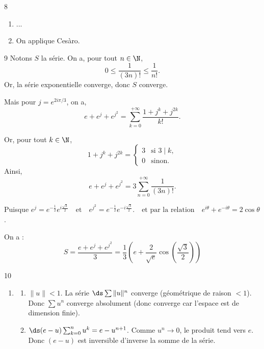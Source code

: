 \begin{correction}{8}
\begin{enumerate}
    \item ...
    \item On applique Cesàro.
\end{enumerate}
\end{correction}

\begin{correction}{9}
    Notons $S$ la série. On a, pour tout $n\in\N$,
    \[
    0\leq \frac{1}{(3n)!}\leq \frac{1}{n!}.
    \]
    Or, la série exponentielle converge, donc $S$ converge.
    
    Mais pour $j=e^{2i\pi/3}$, on a,
    \[
    e+e^j+e^{j^2}
    =\sum_{k=0}^{+\infty}\frac{1+j^k+j^{2k}}{k!}.
    \]
    
    Or, pour tout $k\in\N$,
    \[
    1+j^k+j^{2k}=
    \begin{cases}
        3 & \text{si } 3\mid k,\\
        0 & \text{sinon}.
    \end{cases}
    \]
    Ainsi,
    \[
    e+e^j+e^{j^2}
    =3\sum_{n=0}^{+\infty}\frac{1}{(3n)!}.
    \]
    
    Puisque $ e^j=e^{-\frac12}e^{i\frac{\sqrt{3}}{2}}
    \quad\text{et}\quad
    e^{j^2}=e^{-\frac12}e^{-i\frac{\sqrt{3}}{2}}.
    \quad\text{et par la relation}\quad
    e^{i\theta}+e^{-i\theta} = 2 \cos \theta
    $.
     
    On a :
    \[
    S = \frac{e+e^j+e^{j^2}}{3}
    = \frac13\left(e+\frac{2}{\sqrt{e}}\cos\left(\frac{\sqrt{3}}{2}\right)\right)
    \]
\end{correction}

\begin{correction}{10}
\begin{enumerate}
    \item
    \begin{enumerate}
        \item $\|u\| < 1$. La série $\ds \sum \|u\|^n$ converge (géométrique de raison $< 1$). \\
            Donc $\sum u^n$ converge absolument (donc converge car l'espace est de dimension finie).
        
        \item $\ds (e-u) \sum_{k=0}^n u^k = e - u^{n+1}$.
            Comme $u^n \to 0$, le produit tend vers $e$. \\
            Donc $(e-u)$ est inversible d'inverse la somme de la série.
    \end{enumerate}
\end{enumerate}
\end{correction}

